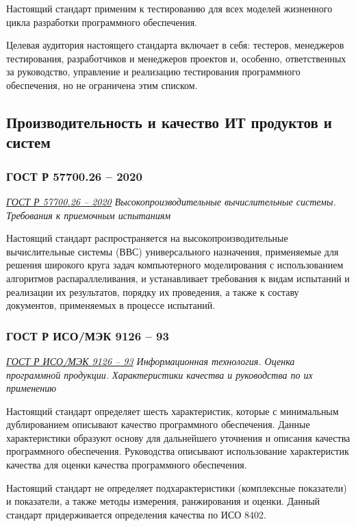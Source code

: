 Настоящий стандарт применим к тестированию
для всех моделей жизненного цикла разработки программного обеспечения.

Целевая аудитория настоящего стандарта включает в себя:
тестеров, менеджеров тестирования, разработчиков и менеджеров проектов и,
особенно, ответственных за руководство, управление
и реализацию тестирования программного обеспечения,
но не ограничена этим списком.

\subsection{Производительность и качество ИТ продуктов и систем}

\subsubsection{ГОСТ Р 57700.26 -- 2020}

\emph{\href{https://docs.cntd.ru/document/573114591}{ГОСТ Р 57700.26 -- 2020}
Высокопроизводительные вычислительные системы.
Требования к приемочным испытаниям
}

Настоящий стандарт распространяется
на высокопроизводительные вычислительные системы (ВВС)
универсального назначения,
применяемые для решения широкого круга задач компьютерного моделирования
с использованием алгоритмов распараллеливания,
и устанавливает требования к видам испытаний и реализации их результатов,
порядку их проведения, а также к составу документов,
применяемых в процессе испытаний.

\subsubsection{ГОСТ Р ИСО/МЭК 9126 -- 93}

\emph{\href{https://docs.cntd.ru/document/1200009076}{ГОСТ Р ИСО/МЭК 9126 -- 93}
Информационная технология.
Оценка программной продукции.
Характеристики качества и руководства по их применению
}

Настоящий стандарт определяет шесть характеристик,
которые с минимальным дублированием описывают качество программного обеспечения.
Данные характеристики образуют основу для дальнейшего уточнения
и описания качества программного обеспечения.
Руководства описывают использование характеристик качества
для оценки качества программного обеспечения.

Настоящий стандарт не определяет подхарактеристики (комплексные показатели)
и показатели, а также методы измерения, ранжирования и оценки.
Данный стандарт придерживается определения качества по ИСО 8402.


